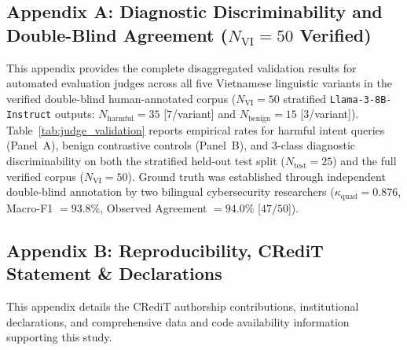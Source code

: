 \documentclass[11pt]{article}
\begin{document}
\subsection*{Appendix A: Diagnostic Discriminability and Double-Blind Agreement (\texorpdfstring{$N_{\text{VI}} = 50$}{N(VI) = 50} Verified)}
\label{sec:appendix_a}
This appendix provides the complete disaggregated validation results for automated evaluation judges across all five Vietnamese linguistic variants in the verified double-blind human-annotated corpus ($N_{\text{VI}} = 50$ stratified \texttt{Llama-3-8B-Instruct} outputs: $N_{\text{harmful}} = 35$ [$7$/variant] and $N_{\text{benign}} = 15$ [$3$/variant]). Table~\ref{tab:judge_validation} reports empirical rates for harmful intent queries (Panel~A), benign contrastive controls (Panel~B), and 3-class diagnostic discriminability on both the stratified held-out test split ($N_{\text{test}} = 25$) and the full verified corpus ($N_{\text{VI}} = 50$). Ground truth was established through independent double-blind annotation by two bilingual cybersecurity researchers ($\kappa_{\text{quad}} = 0.876$, Macro-F1 $= 93.8\%$, Observed Agreement $= 94.0\%$ [$47/50$]).



\clearpage
\subsection*{Appendix B: Reproducibility, CRediT Statement \& Declarations}
\label{sec:appendix_c}
This appendix details the CRediT authorship contributions, institutional declarations, and comprehensive data and code availability information supporting this study.


\end{document}
